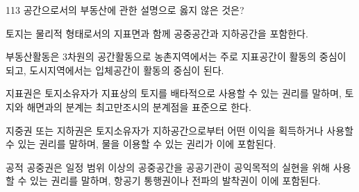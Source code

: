 \begin{question}{113}
공간으로서의 부동산에 관한 설명으로 옳지 않은 것은?
\begin{choices}
  \item 토지는 물리적 형태로서의 지표면과 함께 공중공간과 지하공간을 포함한다.
  \item 부동산활동은 3차원의 공간활동으로 농촌지역에서는 주로 지표공간이 활동의 중심이 되고, 도시지역에서는 입체공간이 활동의 중심이 된다.
  \item 지표권은 토지소유자가 지표상의 토지를 배타적으로 사용할 수 있는 권리를 말하며, 토지와 해면과의 분계는 최고만조시의 분계점을 표준으로 한다.
  \item 지중권 또는 지하권은 토지소유자가 지하공간으로부터 어떤 이익을 획득하거나 사용할 수 있는 권리를 말하며, 물을 이용할 수 있는 권리가 이에 포함된다.
  \item 공적 공중권은 일정 범위 이상의 공중공간을 공공기관이 공익목적의 실현을 위해 사용할 수 있는 권리를 말하며, 항공기 통행권이나 전파의 발착권이 이에 포함된다.
\end{choices}
\end{question}

